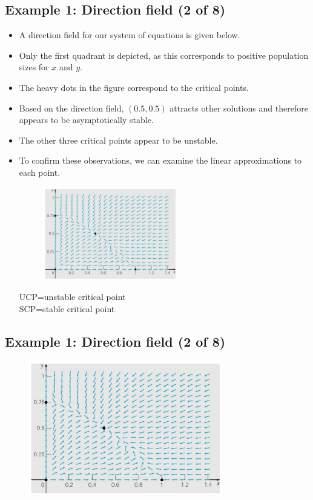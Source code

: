\documentclass[11pt,a4paper]{article}
\begin{document}
	\subsection*{Example 1: Direction field (2 of 8)}
	\begin{itemize}
		\item A direction field for our system of equations is given below.
		\item Only the first quadrant is depicted, as this corresponds to positive population sizes for $x$ and $y$.
		\item The heavy dots in the figure correspond to the critical points.
		\item Based on the direction field, $(0.5,0.5)$ attracts other solutions and therefore appears to be asymptotically stable.
		\item The other three critical points appear to be unstable.
		\item To confirm these observations, we can examine the linear approximations to each point.
		\begin{figure}[H]
			\centering
			\includegraphics[width=0.55\textwidth]{figure/Lec17f1.PNG}
		\end{figure}
		UCP=unstable critical point\\
		SCP=stable critical point
	\end{itemize}
	\subsection*{Example 1: Direction field (2 of 8)}
	\begin{figure}[H]
		\centering
		\includegraphics[width=0.75\textwidth]{figure/Lec17f1.PNG}
	\end{figure}
\end{document}

